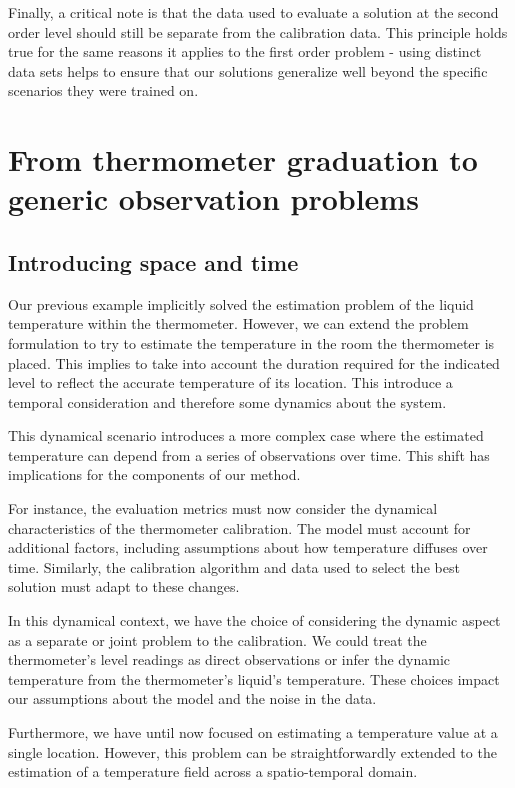 \begin{bibunit}
Finally, a critical note is that the data used to evaluate a solution at the second order level should still be separate from the calibration data. This principle holds true for the same reasons it applies to the first order problem - using distinct data sets helps to ensure that our solutions generalize well beyond the specific scenarios they were trained on.

\section{From thermometer graduation to generic observation problems}
\subsection{Introducing space and time}
Our previous example implicitly solved the estimation problem of the liquid temperature  within the thermometer. However, we can extend the problem formulation to try to estimate the temperature in the room the thermometer is placed. This implies to take into account the duration required for the indicated level to reflect the accurate temperature of its location. This introduce a temporal consideration and therefore some dynamics about the system.

This dynamical scenario introduces a more complex case where the estimated temperature can depend from a series of observations over time. This shift has implications for the components of our method.

For instance, the evaluation metrics must now consider the dynamical characteristics of the thermometer calibration. The model must account for additional factors, including assumptions about how temperature diffuses over time. Similarly, the calibration algorithm and data used to select the best solution must adapt to these changes.

In this dynamical context, we have the choice of considering the dynamic aspect as a separate or joint problem to the calibration. We could treat the thermometer's level readings as direct observations or infer the dynamic temperature from the thermometer's liquid's temperature. These choices impact our assumptions about the model and the noise in the data.

Furthermore, we have until now focused on estimating a temperature value at a single location. However, this problem can be straightforwardly extended to the estimation of a temperature field across a spatio-temporal domain.


\end{bibunit}
